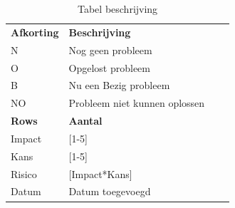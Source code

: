 \documentclass{article}
\begin{document}
\begin{table}

\caption{Tabel beschrijving}
\label{tab: Tabel beschrijving}
\bigskip
\centering\small\setlength\tabcolsep{2pt}
\hspace*{-1cm}\begin{tabular}{l l l l }

\textbf{Afkorting} &\textbf{Beschrijving} \\
N       & Nog geen probleem \\
O       & Opgelost probleem \\
B       & Nu een Bezig probleem \\
NO      & Probleem niet kunnen oplossen \\
\textbf{Rows} &\textbf{Aantal} \\
Impact  & [1-5] \\
Kans    & [1-5] \\
Risico  & [Impact*Kans] \\
Datum   & Datum toegevoegd \\

\end{tabular}\hspace*{-1cm}
\end{table}
\end{document}
